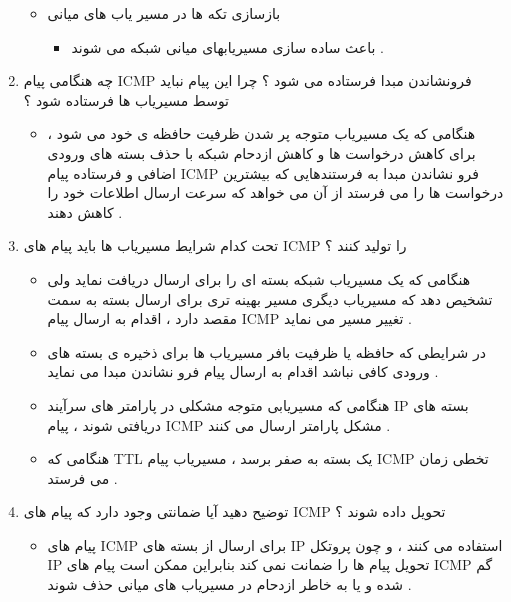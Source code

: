 \documentclass{article}
\begin{document}
\begin{enumerate}
\begin{tcolorbox}
\begin{itemize}
	\item بازسازی تکه ها در مسیر یاب های میانی
	\begin{itemize}
		\item باعث ساده سازی مسیریابهای میانی شبکه می شوند .
	\end{itemize}

\end{itemize}
\end{tcolorbox}

\item چه هنگامی پیام  ICMP فرونشاندن مبدا فرستاده می شود ؟ چرا این پیام نباید توسط مسیریاب ها فرستاده شود ؟

\begin{tcolorbox}
\begin{itemize}
	\item هنگامی که یک مسیریاب متوجه پر شدن ظرفیت حافظه ی خود می شود ، برای کاهش درخواست ها و کاهش ازدحام شبکه با حذف بسته های ورودی اضافی و فرستاده پیام ICMP فرو نشاندن مبدا به فرستندهایی که بیشترین درخواست ها را می فرستد از آن می خواهد که سرعت ارسال اطلاعات خود را کاهش دهند .
\end{itemize}
\end{tcolorbox}


\item تحت کدام شرایط مسیریاب ها باید پیام های ICMP را تولید کنند ؟

\begin{tcolorbox}
\begin{itemize}
	\item هنگامی که یک مسیریاب شبکه بسته ای را برای ارسال دریافت نماید ولی تشخیص دهد که مسیریاب دیگری مسیر بهینه تری برای ارسال بسته به سمت مقصد دارد ، 
	اقدام به ارسال پیام ICMP تغییر مسیر می نماید .
	\item در شرایطی که حافظه یا ظرفیت بافر مسیریاب ها برای ذخیره ی بسته های ورودی کافی نباشد 
	اقدام به ارسال پیام فرو نشاندن مبدا می نماید .
	\item هنگامی که مسیریابی متوجه مشکلی در پارامتر های سرآیند IP بسته های دریافتی شوند ، پیام ICMP
	مشکل پارامتر ارسال می کنند .
	\item هنگامی که TTL یک بسته
	به صفر برسد ، مسیریاب پیام ICMP تخطی زمان می فرستد .
\end{itemize}
\end{tcolorbox}


\newpage

\item توضیح دهید آیا ضمانتی وجود دارد که پیام های ICMP تحویل داده شوند ؟

\begin{tcolorbox}
\begin{itemize}
	\item پیام های ICMP برای ارسال 
	از بسته های IP استفاده می کنند 
	، و چون پروتکل IP تحویل پیام ها را ضمانت نمی کند بنابراین ممکن است پیام های ICMP گم شده و یا به خاطر ازدحام در مسیریاب های میانی حذف شوند .
\end{itemize}
\end{tcolorbox}




\end{enumerate}
\end{document}
